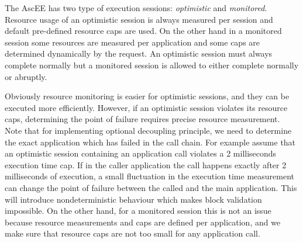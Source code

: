 The AscEE has two type of execution sessions: \emph{optimistic} and \emph{monitored}. Resource usage of an optimistic
session is always measured per session and default pre-defined resource caps are used. On the other hand in a monitored
session some resources are measured per application and some
caps are determined dynamically by the request. An optimistic session must always
complete normally but a monitored session is allowed to either complete normally or abruptly.

Obviously resource monitoring is easier for optimistic sessions, and they can be executed more efficiently. However, if
an optimistic session violates its resource caps, determining the point of failure requires precise resource
measurement. Note that for implementing optional decoupling principle, we need to determine the exact application
which has failed in the call chain. For example assume that an optimistic session containing an application call
violates a 2 milliseconds execution time cap. If in the caller application the call happens exactly after 2
milliseconds of execution, a small fluctuation in the execution time measurement can
change the point of failure between the called and the main application. This will introduce nondeterministic
behaviour which makes block validation impossible. On the other hand, for a monitored session this is not an issue
because resource measurements and caps are defined per application, and we make sure that resource caps are not too
small for any application call.

